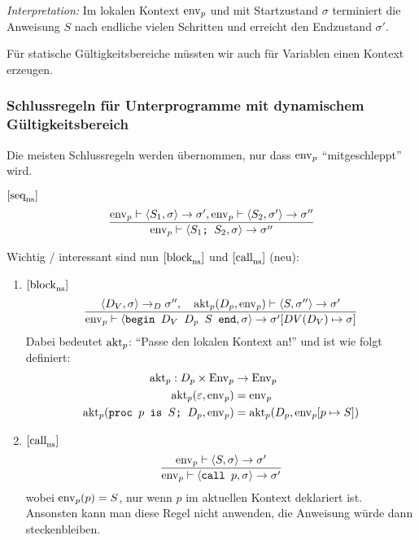 \emph{Interpretation:} Im lokalen Kontext $\operatorname{env}_p$ und mit Startzustand $\sigma$ terminiert die Anweisung $S$ nach endliche vielen Schritten und erreicht den Endzustand $\sigma'$.

\par\medskip
\begin{remark}
    Für statische Gültigkeitsbereiche müssten wir auch für Variablen einen Kontext erzeugen.
\end{remark}




\subsubsection{Schlussregeln für Unterprogramme mit dynamischem Gültigkeitsbereich}

Die meisten Schlussregeln werden übernommen, nur dass $\operatorname{env}_p$ ``mitgeschleppt'' wird.

\begin{example}
    $[\text{seq}_{\text{ns}}^{}]$ \begin{align*}
        \frac{
        \operatorname{env}_p \vdash \langle S_1, \sigma \rangle \to \sigma', \operatorname{env}_p \vdash \langle S_2, \sigma' \rangle \to \sigma''
        }{
            \operatorname{env}_p \vdash \langle \texttt{$S_1$; $S_2$}, \sigma \rangle \to \sigma''
        }
    \end{align*}
\end{example}

Wichtig / interessant sind nun $[\text{block}_{\text{ns}}^{}]$ und $[\text{call}_{\text{ns}}^{}]$ (neu):
\begin{enumerate}
    \item $[\text{block}_{\text{ns}}^{}]$ \begin{align*}
        \frac{
            \langle D_V, \sigma \rangle \to_D \sigma'',
            \quad
            \operatorname{akt}_p(D_p, \operatorname{env}_p) \vdash \langle S, \sigma'' \rangle \to \sigma'
        }{
            \operatorname{env}_p \vdash \langle \texttt{begin $D_V$ $D_p$ $S$ end}, \sigma \rangle \to \sigma'[DV(D_V) \mapsto \sigma]
        }
    \end{align*}
    Dabei bedeutet $\operatorname{akt}_p$: ``Passe den lokalen Kontext an!'' und ist wie folgt definiert:
    \begin{align*}
        \operatorname{akt}_p: D_p \times \operatorname{Env}_p & \to \operatorname{Env}_p \\
        \operatorname{akt}_p(\varepsilon, \operatorname{env}_p) & = \operatorname{env}_p \\
        \operatorname{akt}_p(\texttt{proc $p$ is $S$; $D_p$}, \operatorname{env}_p) & = \operatorname{akt}_p(D_p, \operatorname{env}_p[p \mapsto S])
    \end{align*}

    \item $[\text{call}_{\text{ns}}^{}]$ \begin{align*}
        \frac{
            \operatorname{env}_p \vdash \langle S, \sigma \rangle \to \sigma'
        }{
            \operatorname{env}_p \vdash \langle \texttt{call $p$}, \sigma \rangle \to \sigma'
        }
    \end{align*}
    wobei $\operatorname{env}_p(p) = S$, \dh{} nur wenn $p$ im aktuellen Kontext deklariert ist. Ansonsten kann man diese Regel nicht anwenden, \dh{} die Anweisung würde dann steckenbleiben.
\end{enumerate}

